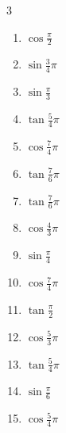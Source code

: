 \begin{multicols}{3}
\begin{enumerate}
  \item $\displaystyle \cos{\frac{\pi}{2}}$
        \phantom{$\displaystyle =0$}

  \item $\displaystyle \sin{\frac{3}{4}\pi}$

  \item $\displaystyle \sin{\frac{\pi}{3}}$

  \item $\displaystyle \tan{\frac{5}{4}\pi}$
        \phantom{$\displaystyle =1$}

  \item $\displaystyle \cos{\frac{7}{4}\pi}$

  \item $\displaystyle \tan{\frac{7}{6}\pi}$

  \item $\displaystyle \tan{\frac{7}{6}\pi}$

  \item $\displaystyle \cos{\frac{4}{3}\pi}$

  \item $\displaystyle \sin{\frac{\pi}{4}}$

  \item $\displaystyle \cos{\frac{7}{4}\pi}$

  \item $\displaystyle \tan{\frac{\pi}{2}}$
        \phantom{$\displaystyle \quad なし$}

  \item $\displaystyle \cos{\frac{5}{3}\pi}$

  \item $\displaystyle \tan{\frac{5}{4}\pi}$
        \phantom{$\displaystyle =1$}

  \item $\displaystyle \sin{\frac{\pi}{6}}$

  \item $\displaystyle \cos{\frac{5}{4}\pi}$


\end{enumerate}
\end{multicols}
